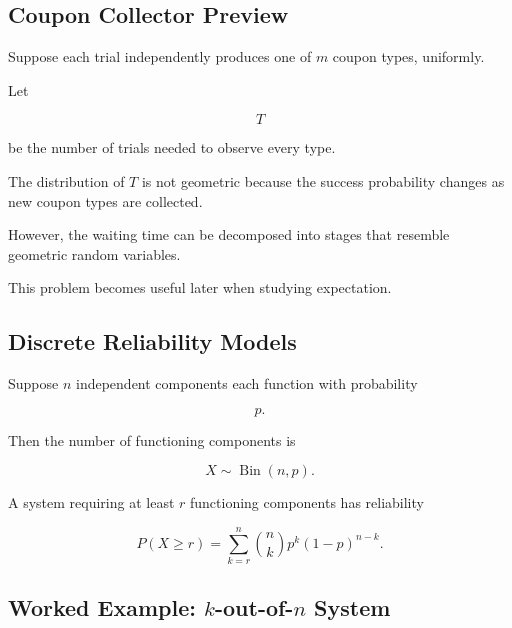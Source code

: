 \subsection{Coupon Collector Preview}
\label{subsec:coupon-collector-preview}

Suppose each trial independently produces one of \(m\) coupon types,
uniformly.

Let

\[
T
\]

be the number of trials needed to observe every type.

The distribution of \(T\) is not geometric because the success
probability changes as new coupon types are collected.

However, the waiting time can be decomposed into stages that resemble
geometric random variables.

This problem becomes useful later when studying expectation.

\subsection{Discrete Reliability Models}
\label{subsec:discrete-reliability-models}

Suppose \(n\) independent components each function with probability

\[
p.
\]

Then the number of functioning components is

\[
\boxed{
X\sim\operatorname{Bin}(n,p).
}
\]

A system requiring at least \(r\) functioning components has reliability

\[
\boxed{
P(X\geq r)
=
\sum_{k=r}^{n}
\binom nk
p^k(1-p)^{n-k}.
}
\]

\subsection{Worked Example: \(k\)-out-of-\(n\) System}
\label{subsec:worked-k-out-of-n}

